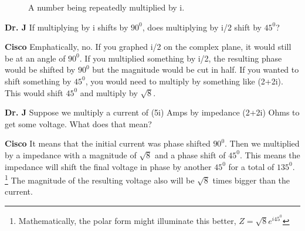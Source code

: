 \documentclass{book}
\numberwithin{equation}{section}
\theoremstyle{definition}
\begin{document}
\begin{figure}[H]
\begin{center}
\end{center}
\caption{A number being repeatedly multiplied by i.}
\label{F:8COM}
\end{figure}

\setlength{\hangindent}{30pt}\noindent \textbf{Dr. J}
If multiplying by i shifts by $90^0$, does multiplying by i/2 shift by $45^0$?

\setlength{\hangindent}{30pt}\noindent \textbf{Cisco}
Emphatically, no. If you graphed i/2 on the complex plane, it would still be at an angle of $90^0$. If you multiplied something by i/2, the resulting phase would be shifted by $90^0$ but the magnitude would be cut in half. If you wanted to shift something by $45^0$, you would need to multiply by something like (2+2i). This would shift $45^0$ and multiply by $\sqrt{8}$.

\setlength{\hangindent}{30pt}\noindent \textbf{Dr. J}
Suppose we multiply a current of (5i) Amps by impedance (2+2i) Ohms to get some voltage. What does that mean?

\setlength{\hangindent}{30pt}\noindent \textbf{Cisco}
It means that the initial current was phase shifted $90^0$. Then we multiplied by a impedance with a magnitude of $\sqrt{8}$ and a phase shift of $45^0$. This means the impedance will shift the final voltage in phase by another $45^0$ for a total of $135^0$. \footnote{Mathematically, the polar form might illuminate this better, $Z =\sqrt{8}e^{i45^0}$ } The magnitude of the resulting voltage also will be $\sqrt{8}$ times bigger than the current.
\end{document}
